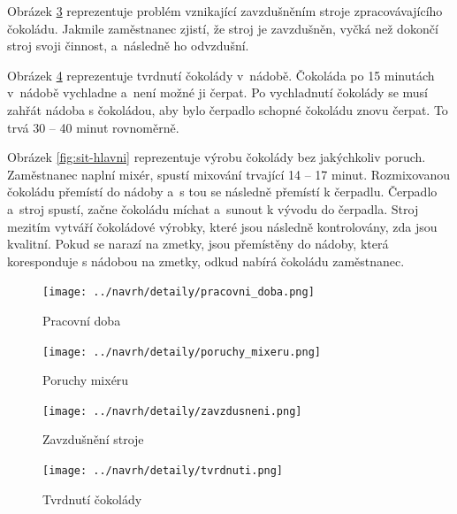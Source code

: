\documentclass[11pt,a4paper,titlepage]{article}
\begin{document}
		Obrázek \ref{fig:sit-zavzdusneni} reprezentuje problém vznikající zavzdušněním stroje zpracovávajícího čokoládu.
		Jakmile zaměstnanec zjistí, že stroj je zavzdušněn, vyčká než dokončí stroj svoji činnost, a~následně ho odvzdušní.

		Obrázek \ref{fig:sit-tvrdnuti} reprezentuje tvrdnutí čokolády v~nádobě.
		Čokoláda po 15 minutách v~nádobě vychladne a~není možné ji čerpat.
		Po vychladnutí čokolády se musí zahřát nádoba s čokoládou, aby bylo čerpadlo schopné čokoládu znovu čerpat.
		To trvá 30 -- 40 minut rovnoměrně.

		Obrázek \ref{fig:sit-hlavni} reprezentuje výrobu čokolády bez jakýchkoliv poruch.
		Zaměstnanec naplní mixér, spustí mixování trvající 14 -- 17 minut.
		Rozmixovanou čokoládu přemístí do nádoby a~s tou se následně přemístí k čerpadlu.
		Čerpadlo a~stroj spustí, začne čokoládu míchat a~sunout k vývodu do čerpadla.
		Stroj mezitím vytváří čokoládové výrobky, které jsou následně kontrolovány, zda jsou kvalitní.
		Pokud se narazí na zmetky, jsou přemístěny do nádoby, která koresponduje s nádobou na zmetky,
		odkud nabírá čokoládu zaměstnanec.

		\begin{figure}
		\begin{center}
			\texttt{[image: ../navrh/detaily/pracovni\_doba.png]}
			\caption{Pracovní doba}
			\label{fig:sit-pracovni_doba}
		\end{center}
		\end{figure}

		\begin{figure}
		\begin{center}
			\texttt{[image: ../navrh/detaily/poruchy\_mixeru.png]}
			\caption{Poruchy mixéru}
			\label{fig:sit-mixer}
		\end{center}
		\end{figure}

		\begin{figure}
		\begin{center}
			\texttt{[image: ../navrh/detaily/zavzdusneni.png]}
			\caption{Zavzdušnění stroje}
			\label{fig:sit-zavzdusneni}
		\end{center}
		\end{figure}

		\begin{figure}
		\begin{center}
			\texttt{[image: ../navrh/detaily/tvrdnuti.png]}
			\caption{Tvrdnutí čokolády}
			\label{fig:sit-tvrdnuti}
		\end{center}
		\end{figure}
\end{document}
